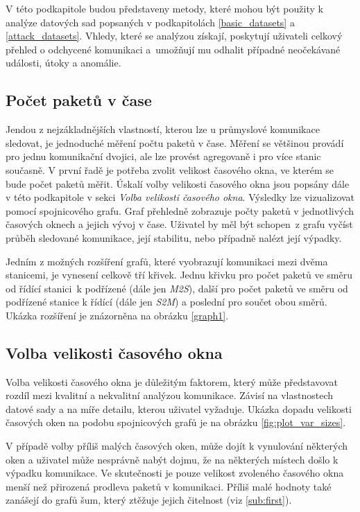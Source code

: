 V této podkapitole budou představeny metody, které mohou být použity k analýze datových sad popsaných v podkapitolách \ref{basic_datasets} a \ref{attack_datasets}. Vhledy, které se analýzou získají, poskytují uživateli celkový přehled o odchycené komunikaci a~umožňují mu odhalit případné neočekávané události, útoky a anomálie.

\subsection{Počet paketů v čase}
\label{packet_counting}

Jendou z nejzákladnějších vlastností, kterou lze u průmyslové komunikace sledovat, je jednoduché měření počtu paketů v čase. Měření se většinou provádí pro jednu komunikační dvojici, ale lze provést agregovaně i pro více stanic současně. V první řadě je potřeba zvolit velikost časového okna, ve kterém se bude počet paketů měřit. Úskalí volby velikosti časového okna jsou popsány dále v této podkapitole v sekci \emph{Volba velikosti časového okna}. Výsledky lze vizualizovat pomocí spojnicového grafu. Graf přehledně zobrazuje počty paketů v jednotlivých časových oknech a jejich vývoj v čase. Uživatel by měl být schopen~z grafu vyčíst průběh sledované komunikace, její stabilitu, nebo případně nalézt její výpadky.

Jedním z možných rozšíření grafů, které vyobrazují komunikaci mezi dvěma stanicemi, je vynesení celkově tří křivek. Jednu křivku pro počet paketů ve směru od řídící stanici~k podřízené (dále jen \emph{M2S}), další pro počet paketů ve směru od podřízené stanice k řídící (dále jen \emph{S2M}) a poslední pro součet obou směrů. Ukázka rozšíření je znázorněna na obrázku \ref{graph1}.

\subsection*{Volba velikosti časového okna}
\label{time_window_size}

Volba velikosti časového okna je důležitým faktorem, který může představovat rozdíl mezi kvalitní a nekvalitní analýzou komunikace. Závisí na vlastnostech datové sady a na míře detailu, kterou uživatel vyžaduje. Ukázka dopadu velikosti časových oken na podobu spojnicových grafů je na obrázku \ref{fig:plot_var_sizes}.

V případě volby příliš malých časových oken, může dojít k vynulování některých oken a uživatel může nesprávně nabýt dojmu, že na některých místech došlo k výpadku komunikace. Ve skutečnosti je pouze velikost zvoleného časového okna menší než přirozená prodleva paketů v komunikaci. Příliš malé hodnoty také zanášejí do grafů šum, který ztěžuje jejich čitelnost (viz \ref{sub:first}).

